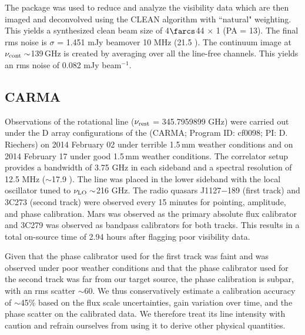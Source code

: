 \documentclass[]{emulateapj}
\begin{document}
The  package was used to reduce and analyze the visibility data
which are then imaged and deconvolved using the CLEAN algorithm with ``natural"
weighting. This yields a synthesized clean beam size of 4$\farcs$44 $\times$ 1 (PA = 13\degr).
The final rms noise is $\sigma$ = 1.451 mJy \kms
beam\pmOne over 10 MHz (21.5 \kms). The continuum image at $\nu_{\rm cont}\sim$139\,GHz 
is created by averaging over all the line-free channels. This
yields an rms noise of 0.082 mJy beam$^{-1}$. %

\subsection{CARMA \cco} %
Observations of the \cco rotational line ($\nu_{\rm rest}$ = 345.7959899 GHz)
were carried out under the D array configurations of the \carma (CARMA;
Program ID: cf0098; PI: D. Riechers) on 2014 February 02 under terrible 1.5\,mm
weather conditions and on 2014 February 17 under good 1.5\,mm
weather conditions. The correlator setup provides a bandwidth of 3.75 GHz in
each sideband and a spectral resolution of 12.5 MHz ($\sim$17.9 \kms). The
line was placed in the lower sideband with the local oscillator tuned to $\nu_{\rm LO}\sim$216 GHz. The radio quasars J1127$-$189 (first track) and 3C273
(second track) were observed
every 15 minutes for pointing, amplitude, and phase calibration. Mars was
observed as the primary absolute flux calibrator and 3C279 was observed as
bandpass calibrators for both tracks. This results in a total on-source time of 2.94 hours after flagging poor
visibility data.

%
Given that the phase calibrator used for the first track was faint and was
observed under poor weather conditions and that the phase calibrator used for
the second track was far from our target source, the phase calibration is
subpar, with an rms scatter $\sim$60\degr. We thus conservatively estimate
a calibration accuracy of $\sim$45\% based on the flux scale uncertainties,
gain variation over time, and the phase scatter on the calibrated data. We
therefore treat its line intensity with caution and refrain ourselves from 
using it to derive other physical quantities.
\end{document}
